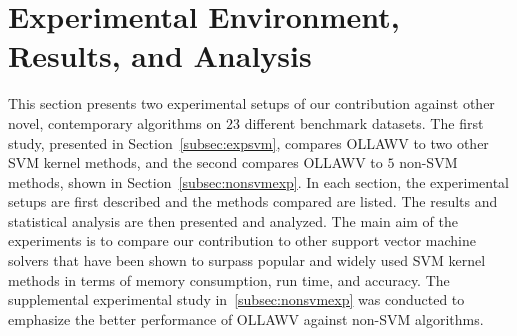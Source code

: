 \documentclass[reqno]{vcuthesis}
\numberwithin{equation}{chapter}
\begin{document}
\section{Experimental Environment, Results, and Analysis}\label{sec:exp}
This section presents two experimental setups of our contribution against other novel, contemporary algorithms on $23$ different benchmark datasets. The first study, presented in Section~\ref{subsec:expsvm}, compares OLLAWV to two other SVM kernel methods, and the second compares OLLAWV to $5$ non-SVM methods, shown in Section~\ref{subsec:nonsvmexp}. In each section, the experimental setups are first described and the methods compared are listed. The results and statistical analysis are then presented and analyzed. The main aim of the experiments is to compare our contribution to other support vector machine solvers that have been shown to surpass popular and widely used SVM kernel methods in terms of memory consumption, run time, and accuracy. The supplemental experimental study in~\ref{subsec:nonsvmexp} was conducted to emphasize the better performance of OLLAWV against non-SVM algorithms.
\end{document}
